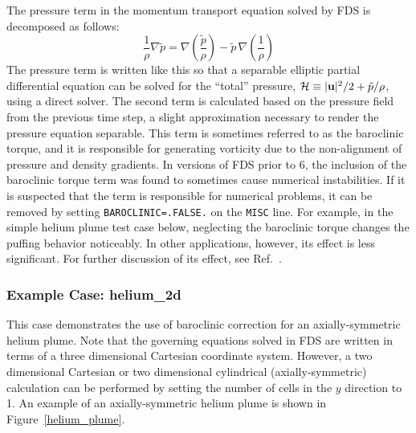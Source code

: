 \documentclass[11pt]{book}
\newcommand{\ct}{\tt\small}
\newcommand{\bu}{{\bf u}}
\newcommand{\tp}{\tilde{p}}
\newcommand{\be}{\begin{equation}}
\newcommand{\ee}{\end{equation}}
\begin{document}
The pressure term in the momentum transport equation solved by FDS is decomposed as follows:
\be \frac{1}{\rho} \nabla \tp = \nabla \left( \frac{\tp}{\rho}\right) - \tp \, \nabla \left(\frac{1}{\rho} \right)  \ee
The pressure term is written like this so that a separable elliptic partial differential equation can be solved for the
``total'' pressure, ${\cal H} \equiv |\bu|^2/2 + \tp/\rho$, using a direct solver. The second term is calculated based on
the pressure field from the previous time step, a slight approximation necessary to render the pressure equation separable.
This term is sometimes referred to as the baroclinic torque, and it is responsible for
generating vorticity due to the non-alignment of pressure and density gradients.
In versions of FDS prior to 6, the inclusion of the baroclinic torque term was found to sometimes cause numerical
instabilities. If it is suspected that the term is responsible for numerical problems, it can be removed by setting {\ct BAROCLINIC=.FALSE.} on the {\ct MISC} line.
For example, in the simple helium plume test case below,
neglecting the baroclinic torque changes the puffing behavior noticeably. In other applications, however, its effect is less significant.
For further discussion of its effect, see Ref.~\cite{Xin:JSS2005}.




\subsubsection{Example Case: {\bf helium\_2d}}

This case demonstrates the use of baroclinic correction for an axially-symmetric helium plume.
Note that the governing equations solved in FDS are written in terms of a
three dimensional Cartesian coordinate system. However,
a two dimensional Cartesian or two dimensional cylindrical
(axially-symmetric) calculation can be performed by setting the number of
cells in the $y$ direction to 1.
An example of an axially-symmetric helium plume is shown in Figure~\ref{helium_plume}.
\end{document}
